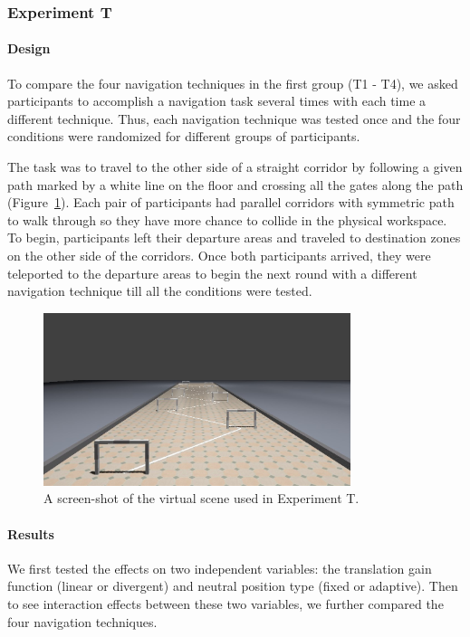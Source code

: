 \subsubsection{Experiment T}
\paragraph{Design}
To compare the four navigation techniques in the first group (T1 - T4), we asked participants to accomplish a navigation task several times with each time a different technique. Thus, each navigation technique was tested once and the four conditions were randomized for different groups of participants.

The task was to travel to the other side of a straight corridor by following a given path marked by a white line on the floor and crossing all the gates along the path (Figure~\ref{fig:3_task1}). Each pair of participants had parallel corridors with symmetric path to walk through so they have more chance to collide in the physical workspace. To begin, participants left their departure areas and traveled to destination zones on the other side of the corridors. Once both participants arrived, they were teleported to the departure areas to begin the next round with a different navigation technique till all the conditions were tested.

\begin{figure}[tb]
  \centering
  \includegraphics[width=0.8\textwidth]{figures/3_t1}
  \caption{\label{fig:3_task1}A screen-shot of the virtual scene used in Experiment T.}
\end{figure}

\paragraph{Results}
We first tested the effects on two independent variables: the translation gain function (linear or divergent) and neutral position type (fixed or adaptive). Then to see interaction effects between these two variables, we further compared the four navigation techniques.

